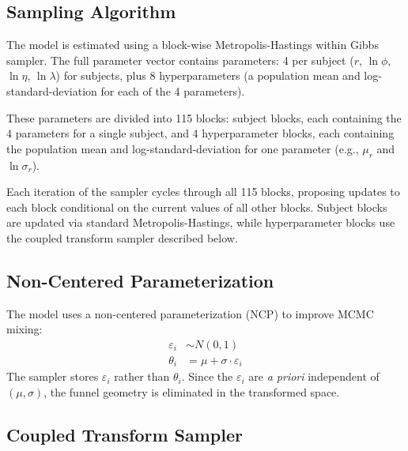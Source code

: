 \label{app:mcmc}

\subsection{Sampling Algorithm}

The model is estimated using a block-wise Metropolis-Hastings within Gibbs
sampler. The full parameter vector contains
 parameters: 4 per subject ($r$, $\ln\phi$,
$\ln\eta$, $\ln\lambda$) for  subjects, plus 8
hyperparameters (a population mean and log-standard-deviation for each of the 4
parameters).

These parameters are divided into 115 blocks:
 subject blocks, each containing the 4
parameters for a single subject, and 4 hyperparameter blocks, each containing
the population mean and log-standard-deviation for one parameter (e.g.,
$\mu_r$ and $\ln\sigma_r$).

\noindent Each iteration of the sampler cycles through all 115 blocks, proposing
updates to each block conditional on the current values of all other blocks.
Subject blocks are updated via standard Metropolis-Hastings, while
hyperparameter blocks use the coupled transform sampler described below.

\subsection{Non-Centered Parameterization}

The model uses a non-centered parameterization (NCP) to improve MCMC mixing:
\begin{align}
  \varepsilon_i &\sim N(0, 1) \\
  \theta_i &= \mu + \sigma \cdot \varepsilon_i
\end{align}
The sampler stores $\varepsilon_i$ rather than $\theta_i$. Since the
$\varepsilon_i$ are \textit{a priori} independent of $(\mu, \sigma)$, the
funnel geometry is eliminated in the transformed space.

\subsection{Coupled Transform Sampler}

